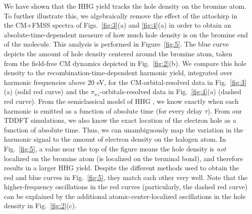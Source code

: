 \documentclass[journal=jacsat,manuscript=article]{achemso}
\begin{document}
We have shown that the HHG yield tracks the hole density on the bromine atom. To further illustrate this, we algebraically remove the effect of the attochirp in the CM+FMSS spectra of Figs.~{\ref{fig:3}}(a) and \ref{fig:4}(a) in order to obtain an absolute-time-dependent measure of how much hole density is on the bromine end of the molecule. This analysis is performed in Figure~{\ref{fig:5}}. The blue curve depicts the amount of hole density centered around the bromine atom, taken from the field-free CM dynamics depicted in Fig.~{\ref{fig:2}}(b). We compare this hole density to the recombination-time-dependent harmonic yield, integrated over harmonic frequencies above 20 eV, for the CM-orbital-resolved data in Fig.~{\ref{fig:3}}(a) (solid red curve) and the $\pi_{xz}$-orbitals-resolved data in Fig.~{\ref{fig:4}}(a) (dashed red curve). From the semiclassical model of HHG \cite{corkum1993, schafer1993, lewenstein1994, chang2011}, we know exactly when each harmonic is emitted as a function of absolute time (for every delay $\tau$). From our TDDFT simulations, we also know the exact location of the electron hole as a function of absolute time. Thus, we can unambiguously map the variation in the harmonic signal to the amount of electron density on the halogen atom. In Fig.~{\ref{fig:5}}, a value near the top of the figure means the hole density is \emph{not} localized on the bromine atom (is localized on the terminal bond), and therefore results in a larger HHG yield. Despite the different methods used to obtain the red and blue curves in Fig.~{\ref{fig:5}}, they match each other very well. Note that the higher-frequency oscillations in the red curves (particularly, the dashed red curve) can be explained by the additional atomic-center-localized oscillations in the hole density in Fig.~{\ref{fig:2}}(c).
\end{document}

